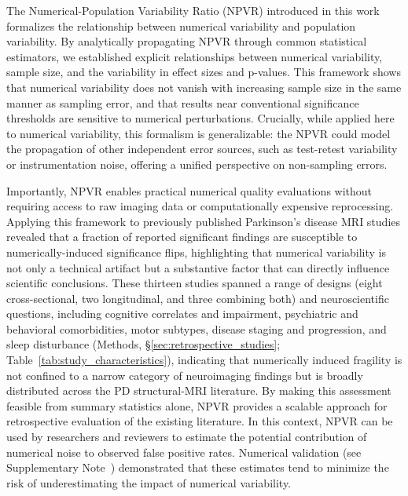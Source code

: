 The Numerical-Population Variability Ratio (NPVR) introduced in this work
formalizes the relationship between numerical variability and population
variability. By analytically propagating NPVR through common statistical
estimators, we established explicit relationships between numerical
variability, sample size, and the variability in effect sizes and p-values. This
framework shows that numerical variability does not vanish with increasing
sample size in the same manner as sampling error, and that results near
conventional significance thresholds are sensitive to numerical perturbations.
Crucially, while applied here to numerical variability, this formalism is
generalizable: the NPVR could model the propagation of other independent error
sources, such as test-retest variability or instrumentation noise, offering a
unified perspective on non-sampling errors.

Importantly, NPVR enables practical numerical quality evaluations without
requiring access to raw imaging data or computationally expensive reprocessing.
Applying this framework to previously published Parkinson's disease MRI studies
revealed that a fraction of reported significant findings are susceptible to
numerically-induced significance flips, highlighting that numerical variability is not
only a technical artifact but a substantive factor that can directly influence
scientific conclusions. These thirteen studies spanned a range of designs
(eight cross-sectional, two longitudinal, and three combining both) and
neuroscientific questions, including cognitive correlates and impairment,
psychiatric and behavioral comorbidities, motor subtypes, disease staging and
progression, and sleep disturbance (Methods,
\S\ref{sec:retrospective_studies}; Table~\ref{tab:study_characteristics}),
indicating that numerically induced fragility is not confined to a narrow
category of neuroimaging findings but is broadly distributed across the PD
structural-MRI literature. By making this assessment feasible from summary
statistics alone, NPVR provides a scalable approach for retrospective
evaluation of the existing literature. In this context, NPVR can be used by
researchers and reviewers to estimate the potential contribution of numerical
noise to observed false positive rates. Numerical validation (see Supplementary
Note~)
demonstrated that these estimates tend to minimize the risk of underestimating
the impact of numerical variability.

